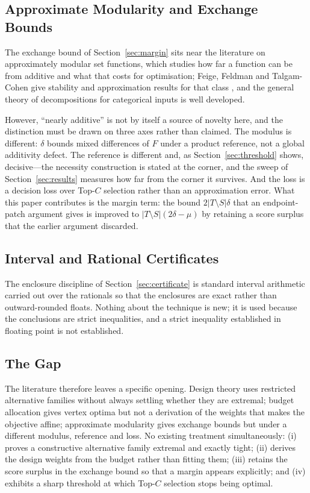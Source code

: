 \subsection{Approximate Modularity and Exchange Bounds}

The exchange bound of Section~\ref{sec:margin} sits near the literature on approximately
modular set functions, which studies how far a function can be from additive and what that
costs for optimisation; Feige, Feldman and Talgam-Cohen give stability and approximation
results for that class \cite{feige2020}, and the general theory of decompositions for
categorical inputs is well developed.

However, ``nearly additive'' is not by itself a source of novelty here, and the distinction
must be drawn on three axes rather than claimed. The modulus is different: $\delta$ bounds
mixed differences of $F$ under a product reference, not a global additivity defect. The
reference is different and, as Section~\ref{sec:threshold} shows, decisive---the necessity
construction is stated at the corner, and the sweep of Section~\ref{sec:results} measures how
far from the corner it survives. And the loss is a decision loss over
Top-$C$ selection rather than an approximation error. What this paper contributes is the
margin term: the bound $2|T\setminus S|\delta$ that an endpoint-patch argument gives is
improved to $|T\setminus S|(2\delta-\mu)$ by retaining a score surplus that the earlier
argument discarded.

\subsection{Interval and Rational Certificates}

The enclosure discipline of Section~\ref{sec:certificate} is standard interval arithmetic
\cite{moore2009} carried out over the rationals so that the enclosures are exact rather than
outward-rounded floats. Nothing about the technique is new; it is used because the
conclusions are strict inequalities, and a strict inequality established in floating point is
not established.

\subsection{The Gap}

The literature therefore leaves a specific opening. Design theory uses restricted alternative
families without always settling whether they are extremal; budget allocation gives vertex
optima but not a derivation of the weights that makes the objective affine; approximate
modularity gives exchange bounds but under a different modulus, reference and loss. No
existing treatment simultaneously: (i) proves a constructive alternative family extremal and
exactly tight; (ii) derives the design weights from the budget rather than fitting them;
(iii) retains the score surplus in the exchange bound so that a margin appears explicitly;
and (iv) exhibits a sharp threshold at which Top-$C$ selection stops being optimal.

